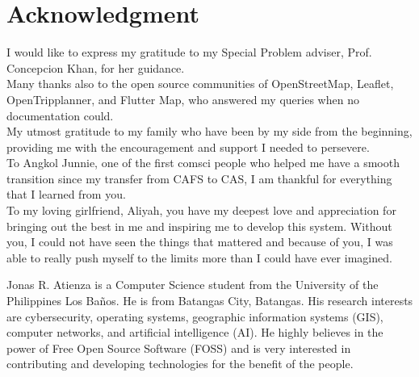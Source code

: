 \documentclass[journal]{./IEEE/IEEEtran}
\begin{document}
\section*{Acknowledgment}
I would like to express my gratitude to my Special Problem adviser, Prof. Concepcion Khan, for her guidance. \hfill \\
Many thanks also to the open source communities of OpenStreetMap, Leaflet, OpenTripplanner, and Flutter Map, who answered my queries when no documentation could. \hfill \\
My utmost gratitude to my family who have been by my side from the beginning, providing me with the encouragement and support I needed to persevere. \hfill \\
To Angkol Junnie, one of the first comsci people who helped me have a smooth transition since my transfer from CAFS to CAS, I am thankful for everything that I learned from you. \hfill \\
To my loving girlfriend, Aliyah, you have my deepest love and appreciation for bringing out the best in me and inspiring me to develop this system. Without you, I could not have seen the things that mattered and because of you, I was able to really push myself to the limits more than I could have ever imagined.



\begin{biography}{Jonas R. Atienza}
    is a Computer Science student from the University of the Philippines Los Baños. He is from Batangas City, Batangas. His research interests are cybersecurity, operating systems, geographic information systems (GIS), computer networks, and artificial intelligence (AI).
He highly believes in the power of Free Open Source Software (FOSS) and is very interested in contributing and developing technologies for the benefit of the people.
\end{biography}
\end{document}
